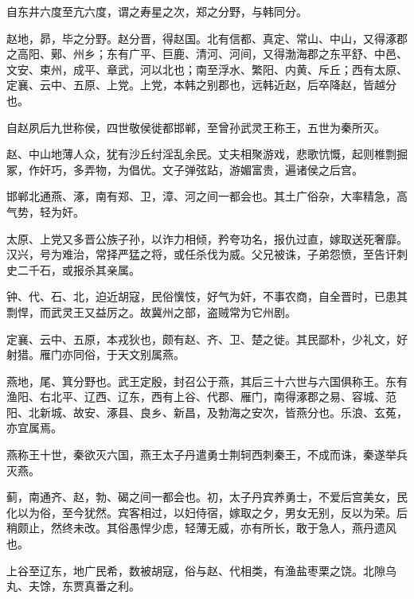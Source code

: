 \documentclass[12pt,UTF8]{ctexbook}
\begin{document}
自东井六度至亢六度，谓之寿星之次，郑之分野，与韩同分。



赵地，昴，毕之分野。赵分晋，得赵国。北有信都、真定、常山、中山，又得涿郡之高阳、鄚、州乡；东有广平、巨鹿、清河、河间，又得渤海郡之东平舒、中邑、文安、束州，成平、章武，河以北也；南至浮水、繁阳、内黄、斥丘；西有太原、定襄、云中、五原、上党。上党，本韩之别郡也，远韩近赵，后卒降赵，皆越分也。



自赵夙后九世称侯，四世敬侯徙都邯郸，至曾孙武灵王称王，五世为秦所灭。



赵、中山地薄人众，犹有沙丘纣淫乱余民。丈夫相聚游戏，悲歌忼慨，起则椎剽掘冢，作奸巧，多弄物，为倡优。文子弹弦跕，游媚富贵，遍诸侯之后宫。



邯郸北通燕、涿，南有郑、卫，漳、河之间一都会也。其土广俗杂，大率精急，高气势，轻为奸。



太原、上党又多晋公族子孙，以诈力相倾，矜夸功名，报仇过直，嫁取送死奢靡。汉兴，号为难治，常择严猛之将，或任杀伐为威。父兄被诛，子弟怨愤，至告讦刺史二千石，或报杀其亲属。



钟、代、石、北，迫近胡寇，民俗懻忮，好气为奸，不事农商，自全晋时，已患其剽悍，而武灵王又益厉之。故冀州之部，盗贼常为它州剧。



定襄、云中、五原，本戎狄也，颇有赵、齐、卫、楚之徙。其民鄙朴，少礼文，好射猎。雁门亦同俗，于天文别属燕。



燕地，尾、箕分野也。武王定殷，封召公于燕，其后三十六世与六国俱称王。东有渔阳、右北平、辽西、辽东，西有上谷、代郡、雁门，南得涿郡之易、容城、范阳、北新城、故安、涿县、良乡、新昌，及勃海之安次，皆燕分也。乐浪、玄菟，亦宜属焉。



燕称王十世，秦欲灭六国，燕王太子丹遣勇士荆轲西刺秦王，不成而诛，秦遂举兵灭燕。



蓟，南通齐、赵，勃、碣之间一都会也。初，太子丹宾养勇士，不爱后宫美女，民化以为俗，至今犹然。宾客相过，以妇侍宿，嫁取之夕，男女无别，反以为荣。后稍颇止，然终未改。其俗愚悍少虑，轻薄无威，亦有所长，敢于急人，燕丹遗风也。



上谷至辽东，地广民希，数被胡寇，俗与赵、代相类，有渔盐枣栗之饶。北隙乌丸、夫馀，东贾真番之利。
\end{document}
